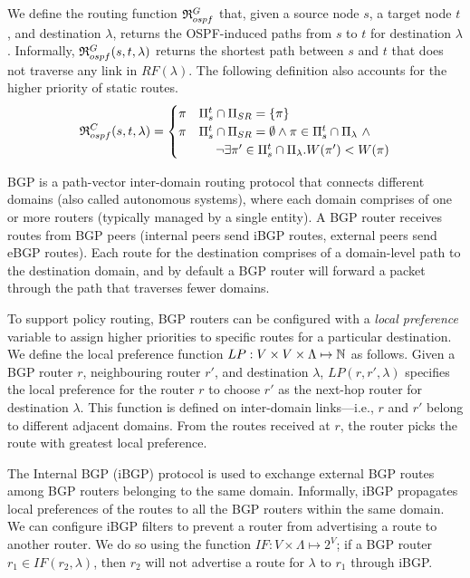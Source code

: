 We define the routing function 
$\mathfrak{R}_{ospf}^G$ 
that, given 
a source node $s$,
a target node $t$,
and destination   
$\lambda$,
returns the OSPF-induced paths from $s$ to $t$ for destination   $\lambda$.
Informally, $\mathfrak{R}_{ospf}^G(s,t,\lambda)$ returns the shortest path between
$s$ and $t$ that does not traverse any link in $RF(\lambda)$. The following definition also
accounts for the higher priority of static routes.
\[
\mathfrak{R}_{ospf}^C(s,t,\lambda) = 
\begin{cases}
\pi  & \text{$\Pi_s^t \cap \Pi_{SR} =\{\pi\}$} \\
\pi & 
\text{$\Pi_s^t \cap \Pi_{SR} =\emptyset \wedge \pi\in \Pi_s^t\cap \Pi_\lambda ~\wedge $}  \\
& \text{~~~~$\neg\exists \pi'\in\Pi_s^t\cap \Pi_\lambda . W(\pi')< W(\pi)$} 
\end{cases}
\]

 BGP is a path-vector inter-domain routing protocol
that connects different domains (also called autonomous systems), where each domain
comprises of one or more routers (typically managed by a single
entity). A BGP router receives routes from BGP peers (internal peers
send iBGP routes, external peers send eBGP routes). Each route for the
destination comprises of a domain-level path to the destination
domain, and by default a BGP router will forward a packet through  the path that traverses fewer domains.
 
To support policy routing, BGP routers can be configured with a
\emph{local preference} variable to assign higher priorities to
specific routes for a particular destination. We define the local
preference function $LP: V \times V \times \Lambda \mapsto \mathbb{N}$ as
follows.  Given a BGP router $r$, neighbouring router $r'$, and  
destination $\lambda$, $LP(r, r', \lambda)$ specifies the local
preference for the router $r$ to choose $r'$ as the next-hop router for destination $\lambda$.  This function is defined
on inter-domain links---i.e., $r$ and $r'$ belong to different adjacent domains.  
From the routes received at $r$, the router
picks the route with greatest local preference.

The Internal BGP (iBGP) protocol is used to 
exchange external BGP routes 
among BGP routers belonging
to the same domain. Informally, iBGP propagates local preferences of the routes to all the BGP routers within the same domain. 
We can configure iBGP 
filters to prevent a router from advertising 
a route to another router. We do so using the 
function $IF: V \times \Lambda \mapsto 2^V$;
if a BGP router $r_1 \in IF(r_2, \lambda)$, then
$r_2$ will not advertise a route for $\lambda$ to
$r_1$ through iBGP. 
 
